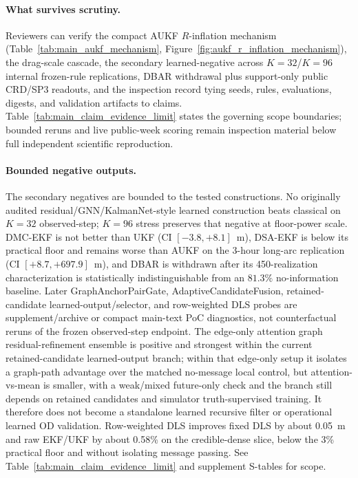 \documentclass{article}
\begin{document}
\paragraph{What survives scrutiny.}
Reviewers can verify the compact AUKF \(R\)-inflation mechanism (Table~\ref{tab:main_aukf_mechanism}, Figure~\ref{fig:aukf_r_inflation_mechanism}), the drag-scale cascade, the secondary learned-negative across $K=32$/$K=96$ internal frozen-rule replications, DBAR withdrawal plus support-only public CRD/SP3 readouts, and the inspection record tying seeds, rules, evaluations, digests, and validation artifacts to claims. Table~\ref{tab:main_claim_evidence_limit} states the governing scope boundaries; bounded reruns and live public-week scoring remain inspection material below full independent scientific reproduction.

\paragraph{Bounded negative outputs.}
The secondary negatives are bounded to the tested constructions. No originally audited residual/GNN/KalmanNet-style learned construction beats classical on $K=32$ observed-step; $K=96$ stress preserves that negative at floor-power scale. DMC-EKF is not better than UKF (CI $[-3.8,+8.1]$~m), DSA-EKF is below its practical floor and remains worse than AUKF on the 3-hour long-arc replication (CI $[+8.7,+697.9]$~m), and DBAR is withdrawn after its 450-realization characterization is statistically indistinguishable from an $81.3\%$ no-information baseline. Later GraphAnchorPairGate, AdaptiveCandidateFusion, retained-candidate learned-output/selector, and row-weighted DLS probes are supplement/archive or compact main-text PoC diagnostics, not counterfactual reruns of the frozen observed-step endpoint. The edge-only attention graph residual-refinement ensemble is positive and strongest within the current retained-candidate learned-output branch; within that edge-only setup it isolates a graph-path advantage over the matched no-message local control, but attention-vs-mean is smaller, with a weak/mixed future-only check and the branch still depends on retained candidates and simulator truth-supervised training. It therefore does not become a standalone learned recursive filter or operational learned OD validation. Row-weighted DLS improves fixed DLS by about 0.05~m and raw EKF/UKF by about 0.58\% on the credible-dense slice, below the 3\% practical floor and without isolating message passing. See Table~\ref{tab:main_claim_evidence_limit} and supplement S-tables for scope.
\end{document}
